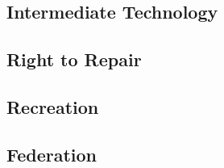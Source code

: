 \documentclass[letterpaper]{article}
\begin{document}
\subsection{Intermediate Technology}
\hfill

\hfill

\hfill

\hfill

\hfill

\hfill

\hfill

\subsection{Right to Repair}
\hfill

\hfill

\hfill

\hfill

\hfill

\hfill

\hfill

\subsection{Recreation}
\hfill

\hfill

\hfill

\hfill

\hfill

\hfill

\hfill

\subsection{Federation}
\hfill

\hfill

\hfill

\hfill

\hfill

\hfill

\hfill
\fi
\end{document}
